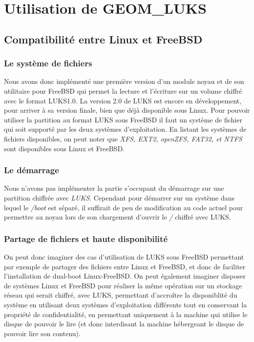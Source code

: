 \chapter{Utilisation de GEOM\_LUKS}

\section{Compatibilité entre Linux et FreeBSD}

\subsection{Le système de fichiers}
Nous avons donc implémenté une première version d'un module noyau et de son
utilitaire pour FreeBSD qui permet la lecture et l'écriture sur un volume chiffré
avec le format LUKS1.0. La version 2.0 de LUKS est encore en développement,
pour arriver à sa version finale, bien que déjà disponible sous Linux. Pour
pouvoir utiliser la partition au format LUKS sous FreeBSD il faut un système de
fichier qui soit supporté par les deux systèmes d'exploitation. En listant
les systèmes de fichiers disponibles, on peut noter que {\em XFS, EXT2, openZFS,
FAT32, et NTFS} sont disponibles sous Linux et FreeBSD.

\subsection{Le démarrage}
Nous n'avons pas implémenter la partie s'occupant du démarrage sur une partition
chiffrée avec {\em LUKS}. Cependant pour démarrer sur un système dans lequel le
{\em /boot} est séparé, il suffirait de peu de modification au code actuel pour
permettre au noyau lors de son chargement d'ouvrir le {\em /} chiffré avec LUKS.


\subsection{Partage de fichiers et haute disponibilité}
On peut donc imaginer des cas d'utilisation de LUKS sous FreeBSD permettant par
exemple de partager des fichiers entre Linux et FreeBSD, et donc de faciliter
l'installation de dual-boot Linux-FreeBSD. On peut également imaginer disposer
de systèmes Linux et FreeBSD pour réaliser la même opération sur un stockage
réseau qui serait chiffré, avec LUKS, permettant d'accroître la disponiblité du
système en utilisant deux systèmes d'exploitation différents tout en conservant
la propriété de confidentialité, en permettant uniquement à la machine qui
utilise le disque de pouvoir le lire (et donc interdisant la machine hébergeant
le disque de pouvoir lire son contenu).
